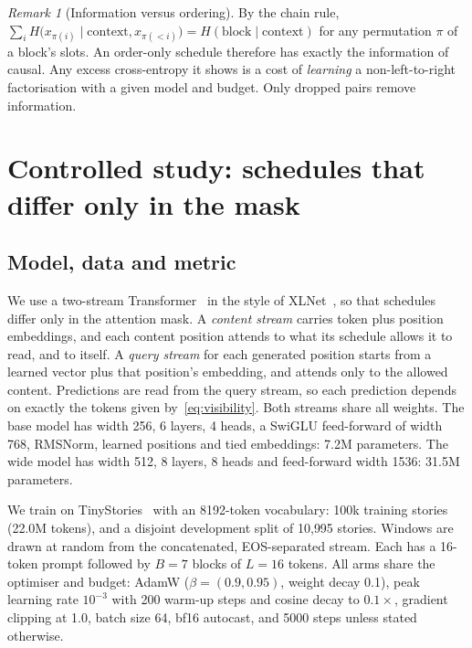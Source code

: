 \documentclass[11pt]{article}
\theoremstyle{definition}
\theoremstyle{remark}
\newtheorem{remark}{Remark}
\newcommand{\sch}[1]{\textsf{#1}}
\begin{document}
\begin{remark}[Information versus ordering]
\label{rem:chain}
By the chain rule, $\sum_i H\big(x_{\pi(i)}\mid \text{context},x_{\pi(<i)}\big)=H(\text{block}\mid\text{context})$ for any permutation $\pi$ of a block's slots.
An order-only schedule therefore has exactly the information of \sch{causal}.
Any excess cross-entropy it shows is a cost of \emph{learning} a non-left-to-right factorisation with a given model and budget.
Only dropped pairs remove information.
\end{remark}

\section{Controlled study: schedules that differ only in the mask}
\label{sec:study}

\subsection{Model, data and metric}

We use a two-stream Transformer~\citep{vaswani2017attention} in the style of XLNet~\citep{yang2019xlnet}, so that schedules differ only in the attention mask.
A \emph{content stream} carries token plus position embeddings, and each content position attends to what its schedule allows it to read, and to itself.
A \emph{query stream} for each generated position starts from a learned vector plus that position's embedding, and attends only to the allowed content.
Predictions are read from the query stream, so each prediction depends on exactly the tokens given by~\eqref{eq:visibility}.
Both streams share all weights.
The base model has width 256, 6 layers, 4 heads, a SwiGLU feed-forward of width 768, RMSNorm, learned positions and tied embeddings: 7.2M parameters.
The wide model has width 512, 8 layers, 8 heads and feed-forward width 1536: 31.5M parameters.

We train on TinyStories~\citep{eldan2023tinystories} with an 8192-token vocabulary: 100k training stories (22.0M tokens), and a disjoint development split of 10{,}995 stories.
Windows are drawn at random from the concatenated, EOS-separated stream.
Each has a 16-token prompt followed by $B=7$ blocks of $L=16$ tokens.
All arms share the optimiser and budget: AdamW ($\beta=(0.9,0.95)$, weight decay 0.1), peak learning rate $10^{-3}$ with 200 warm-up steps and cosine decay to $0.1\times$, gradient clipping at 1.0, batch size 64, bf16 autocast, and 5000 steps unless stated otherwise.
\end{document}
